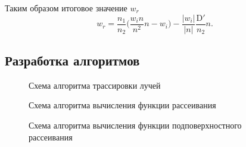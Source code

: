Таким образом итоговое значение $w_r$
\begin{equation}
    w_r = \frac{n_1}{n_2}\Big( \frac{w_i n}{n^2}n - w_i\Big) - \frac{|w_i|}{|n|} \frac{\mathrm{D'}}{n_2} n.
\end{equation}

\subsection{Разработка алгоритмов}

\vfill
\begin{figure}[h]
    \centering
    \def\svgwidth{0.95\textwidth}
    
    \caption{Схема алгоритма трассировки лучей}
    \label{fig:algorithm_rt}
\end{figure}
\vfill
\pagebreak

\begin{figure}[h]
    \centering
    \def\svgwidth{0.6\textwidth}
    
    \caption{Схема алгоритма вычисления функции рассеивания}
    \label{fig:algorithm_bsdf}
\end{figure}
\pagebreak

\begin{figure}[h]
    \centering
    \def\svgwidth{0.2\textwidth}
    
    \caption{Схема алгоритма вычисления функции подповерхностного рассеивания}
    \label{fig:algorithm_bssrdf}
\end{figure}
\pagebreak

\pagebreak

